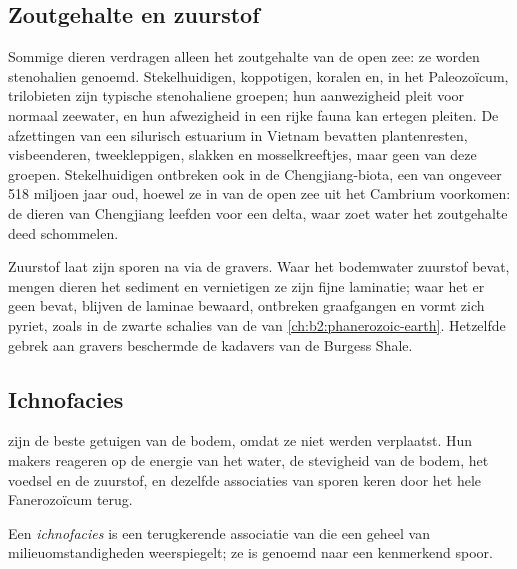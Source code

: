 \subsection*{Zoutgehalte en zuurstof}

Sommige dieren verdragen alleen het zoutgehalte van de open zee: ze worden stenohalien genoemd. Stekelhuidigen,
koppotigen, koralen en, in het Paleozoïcum, trilobieten zijn typische stenohaliene groepen; hun
aanwezigheid pleit voor normaal zeewater, en hun afwezigheid in een rijke fauna kan ertegen pleiten.
De afzettingen van een silurisch estuarium in Vietnam bevatten plantenresten, visbeenderen, tweekleppigen, slakken
en mosselkreeftjes, maar geen van deze groepen. Stekelhuidigen ontbreken ook in de Chengjiang-biota,
een  van ongeveer 518 miljoen jaar oud, hoewel ze in  van de open zee uit het
Cambrium voorkomen: de dieren van Chengjiang leefden voor een delta, waar zoet water het zoutgehalte deed schommelen.

Zuurstof laat zijn sporen na via de gravers. Waar het bodemwater zuurstof bevat, mengen dieren het
sediment en vernietigen ze zijn fijne laminatie; waar het er geen bevat, blijven de laminae bewaard, ontbreken graafgangen
en vormt zich pyriet, zoals in de zwarte schalies van de  van
\cref{ch:b2:phanerozoic-earth}. Hetzelfde gebrek aan gravers beschermde de kadavers van de Burgess
Shale.

\subsection*{Ichnofacies}

 zijn de beste getuigen van de bodem, omdat ze niet werden verplaatst. Hun makers
reageren op de energie van het water, de stevigheid van de bodem, het voedsel en de zuurstof, en dezelfde
associaties van sporen keren door het hele Fanerozoïcum terug.

\begin{definition}[Ichnofacies]\label{def:b2:palaeoenvironments:ichnofacies}
Een \emph{ichnofacies} is een terugkerende associatie van  die
een geheel van milieuomstandigheden weerspiegelt; ze is genoemd naar een kenmerkend spoor.
\end{definition}

